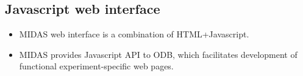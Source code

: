 \subsection{Javascript web interface}

\begin{itemize}
\item 
  MIDAS web interface is a combination of HTML+Javascript.
\item 
  MIDAS provides Javascript API to ODB, which facilitates development of
  functional experiment-specific web pages.
\end{itemize}







